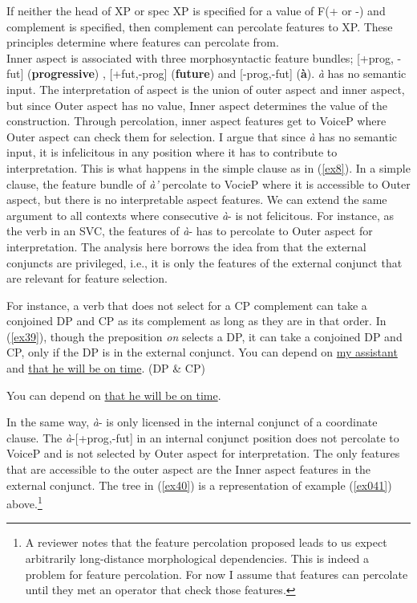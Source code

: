 \documentclass[output=paper,colorlinks,citecolor=brown]{langscibook}
\begin{document}
\ex If neither the head of XP or spec XP is specified for a value of F(+ or -) and complement is specified, then complement can percolate features to XP. 
\z
\z
These principles determine where features can percolate from.\\ 
Inner aspect is associated with three morphosyntactic feature bundles; [+prog, -fut] (\textbf{progressive}) , [+fut,-prog] (\textbf{future}) and [-prog,-fut] (\textbf{\`a}).  \emph{\`a} has no semantic input. The interpretation of aspect is the union of outer aspect and inner aspect, but since Outer aspect has no value, Inner aspect determines the value of the construction. Through percolation, inner aspect features get to VoiceP where Outer aspect can check them for selection.  I argue that since \emph{\`a} has no semantic input, it is infelicitous in any position where it has to contribute to interpretation. This is what happens in the simple clause as in (\ref{ex8}). In a simple clause, the feature bundle of \emph{\`a'}  percolate to VocieP where it is accessible to Outer aspect, but there is no interpretable aspect features. We can extend the same argument to all contexts where consecutive \emph{\`a}- is not felicitous. For instance, as the verb in an SVC, the features of \emph{\`a}- has to percolate to Outer aspect for interpretation. The analysis here borrows the idea from  \citet{Zhang2009} that the external conjuncts are privileged, i.e., it is only the features of the external conjunct that are relevant for feature selection. 

For instance, a verb that does not select for a CP complement can take a conjoined DP and CP as its complement as long as they are in that order. In (\ref{ex39}), though the preposition \emph{ on} selects a DP, it can take a conjoined DP and CP, only if the DP is in the external conjunct.
\ea\label{ex39}
\ea You can depend on \underline{my assistant} and \underline{that he will be on time}. (DP \& CP)

\ex You can depend on \underline{that he will be on time}.

\z 
\z  In the same way, \emph{\`a}-  is only licensed in the internal conjunct of a coordinate clause. The \emph{\`a}-[+prog,-fut] in an internal conjunct position does not percolate to VoiceP and is not selected by Outer aspect for interpretation. The only features that are accessible to the outer aspect are the Inner aspect features in the external conjunct. The tree in (\ref{ex40}) is a representation of example (\ref{ex041}) above.\footnote{A reviewer notes that the feature percolation proposed leads to us expect arbitrarily long-distance morphological dependencies. This is indeed a problem for feature percolation. For now I assume that features can percolate until they met an operator that check those features.}  
\ea \label{ex40}
\end{document}
